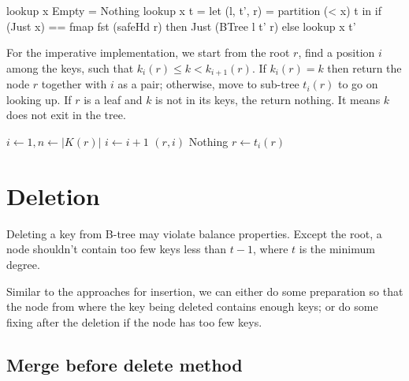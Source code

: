 \documentclass[b5paper]{article}
\begin{document}
\begin{Haskell}
lookup x Empty = Nothing
lookup x t = let (l, t', r) = partition (< x) t in
  if (Just x) == fmap fst (safeHd r) then Just (BTree l t' r)
  else lookup x t'
\end{Haskell}

For the imperative implementation, we start from the root $r$, find a position $i$ among the keys, such that $k_i(r) \leq k < k_{i+1}(r)$. If $k_i(r) = k$ then return the node $r$ together with $i$ as a pair; otherwise, move to sub-tree $t_i(r)$ to go on looking up. If $r$ is a leaf and $k$ is not in its keys, the return nothing. It means $k$ does not exit in the tree.

\begin{algorithmic}[1]
  \Loop
    \State $i \gets 1, n \gets |K(r)|$
      \State $i \gets i + 1$
    \EndWhile
      \State \Return $(r, i)$
    \EndIf
      \State \Return Nothing 
    \Else
      \State $r \gets t_i(r)$ 
    \EndIf
  \EndLoop
\EndFunction
\end{algorithmic}

\begin{Exercise}
\end{Exercise}

\section{Deletion}

Deleting a key from
B-tree may violate balance properties. Except the root, a node shouldn't
contain too few keys less than $t-1$, where $t$ is the
minimum degree.

Similar to the approaches for insertion, we can either do some preparation
so that the node from where the key being deleted contains enough
keys; or do some fixing after the deletion if the node has too few keys.


\subsection{Merge before delete method}
\end{document}
